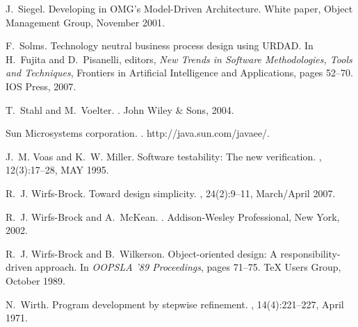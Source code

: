 \documentclass[reviewcopy]{elsart}
\begin{document}
\begin{thebibliography}{10}
J.~Siegel.
\newblock Developing in {OMG}'s {M}odel-{D}riven {A}rchitecture.
\newblock White paper, Object Management Group, November 2001.

F.~Solms.
\newblock Technology neutral business process design using {URDAD}.
\newblock In H.~Fujita and D.~Pisanelli, editors, {\em New Trends in Software
  Methodologies, Tools and Techniques}, Frontiers in Artificial Intelligence
  and Applications, pages 52--70. IOS Press, 2007.

T.~Stahl and M.~Voelter.
.
\newblock John Wiley \& Sons, 2004.

{Sun Microsystems corporation}.
.
\newblock http://java.sun.com/javaee/.

J.~M. Voas and K.~W. Miller.
\newblock Software testability: The new verification.
, 12(3):17--28, MAY 1995.

R.~J. Wirfs-Brock.
\newblock Toward design simplicity.
, 24(2):9--11, March/April 2007.

R.~J. Wirfs-Brock and A.~McKean.
.
\newblock Addison-Wesley Professional, New York, 2002.

R.~J. Wirfs-Brock and B.~Wilkerson.
\newblock Object-oriented design: A responsibility-driven approach.
\newblock In {\em OOPSLA '89 Proceedings}, pages 71--75. TeX Users Group,
  October 1989.

N.~Wirth.
\newblock Program development by stepwise refinement.
, 14(4):221--227, April 1971.

\end{thebibliography}
%
%
\end{document}
